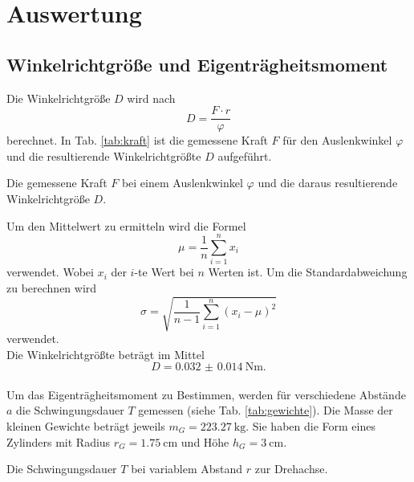 \section{Auswertung}
\label{sec:Auswertung}
\subsection{Winkelrichtgröße und Eigenträgheitsmoment}
Die Winkelrichtgröße $D$ wird nach
\begin{equation*}
    D = \frac{F \cdot r}{\varphi}
\end{equation*} 
berechnet.
In Tab. \ref{tab:kraft} ist die gemessene Kraft $F$ für den Auslenkwinkel $\varphi$ und die resultierende Winkelrichtgrößte $D$ aufgeführt.
\begin{table}
    \centering
    \caption{Die gemessene Kraft $F$ bei einem Auslenkwinkel $\varphi$ und die daraus resultierende Winkelrichtgröße $D$.}
    \label{tab:kraft}  
\end{table}
\FloatBarrier
Um den Mittelwert zu ermitteln wird die Formel
\begin{equation}
    \mu = \frac{1}{n} \sum_{i=1}^n x_i
\end{equation}
verwendet.
Wobei $x_i$ der $i$-te Wert bei $n$ Werten ist.
Um die Standardabweichung zu berechnen wird
\begin{equation}
    \sigma = \sqrt{\frac{1}{n-1} \sum_{i=1}^n (x_i - \mu)^2}
\end{equation}
verwendet.\\
Die Winkelrichtgrößte beträgt im Mittel
\begin{equation*}
    D = \SI{0.032(14)}{\newton\metre} .
\end{equation*}
\\
Um das Eigenträgheitsmoment zu Bestimmen, werden für verschiedene Abstände $a$ die Schwingungsdauer $T$ gemessen (siehe Tab. \ref{tab:gewichte}).
Die Masse der kleinen Gewichte beträgt jeweils $m_G = \SI{223,27}{\kg}$.
Sie haben die Form eines Zylinders mit Radius $r_G=\SI{1,75}{\centi\metre}$ und Höhe $h_G=\SI{3}{\centi\metre}$.
\begin{table}
    \centering
    \caption{Die Schwingungsdauer $T$ bei variablem Abstand $r$ zur Drehachse.}
    \label{tab:gewichte}  
\end{table}
